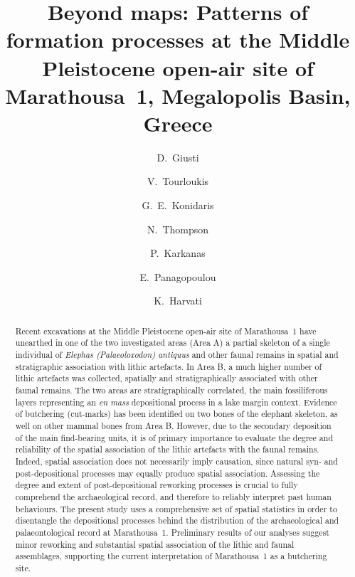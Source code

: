 \documentclass[preprint,authoryear,times]{elsarticle} %
\begin{document}
\begin{frontmatter}
  
  \title{Beyond maps: Patterns of formation processes at the Middle Pleistocene open-air site of Marathousa~1, Megalopolis Basin, Greece}
  
  \author[tue]{D.~Giusti}
  
  \author[tue]{V.~Tourloukis}
  \author[tue]{G.~E.~Konidaris}
  \author[tue]{N.~Thompson}
  \author[wiener]{P.~Karkanas}
  \author[ephoreia]{E.~Panagopoulou}
  \author[tue]{K.~Harvati}
  
  \address[tue]{Paläoanthropologie, Senckenberg Centre for Human Evolution and Palaeoenvironment, Eberhard Karls Universität Tübingen, Rümelinstr. 23, 72070 Tübingen, Germany}
  \address[wiener]{Malcolm H. Wiener Laboratory for Archaeological Science, American School of Classical Studies at Athens, Greece}
  \address[ephoreia]{Ephoreia of Palaeoanthropology-Speleology of Greece, Athens, Greece}

  \begin{abstract}
    Recent excavations at the Middle Pleistocene open-air site of Marathousa~1 have unearthed in one of the two investigated areas (Area A) a partial skeleton of a single individual of \emph{Elephas (Palaeoloxodon) antiquus} and other faunal remains in spatial and stratigraphic association with lithic artefacts. In Area B, a much higher number of lithic artefacts was collected, spatially and stratigraphically associated with other faunal remains. The two areas are stratigraphically correlated, the main fossiliferous layers representing an \emph{en mass} depositional process in a lake margin context. Evidence of butchering (cut-marks) has been identified on two bones of the elephant skeleton, as well on other mammal bones from Area B. However, due to the secondary deposition of the main find-bearing units, it is of primary importance to evaluate the degree and reliability of the spatial association of the lithic artefacts with the faunal remains. Indeed, spatial association does not necessarily imply causation, since natural syn- and post-depositional processes may equally produce spatial association. Assessing the degree and extent of post-depositional reworking processes is crucial to fully comprehend the archaeological record, and therefore to reliably interpret past human behaviours. The present study uses a comprehensive set of spatial statistics in order to disentangle the depositional processes behind the distribution of the archaeological and palaeontological record at Marathousa~1. Preliminary results of our analyses suggest minor reworking and substantial spatial association of the lithic and faunal assemblages, supporting the current interpretation of Marathousa~1 as a butchering site.
  \end{abstract}


\end{frontmatter}
\end{document}
